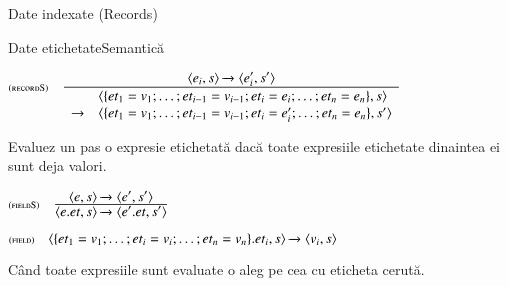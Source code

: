 \documentclass[xcolor=pdftex,romanian,colorlinks]{beamer}
\begin{document}
\begin{section}{Date indexate (Records)}
\begin{frame}{Date etichetate}{Semantică}
\begin{itemize}
\vitem[] $\reg[recordS]{\begin{array}{ll}&\c{\{{\it et}_1 = v_1;\ldots;{\it et}_{i-1}=v_{i-1};{\it et}_i = e_i;\ldots;{\it et}_{n}=e_{n}\},s}\\\rightarrow&\c{\{{\it et}_1 = v_1;\ldots;{\it et}_{i-1}=v_{i-1};{\it et}_i = e_i';\ldots;{\it et}_{n}=e_{n}\},s'}\end{array}}{\Ss{\c{e_i,s}}{\c{e_i',s'}}}{}$

Evaluez un pas o expresie etichetată dacă toate expresiile etichetate dinaintea ei sunt deja valori.

\vitem[] $\reg[fieldS]{\Ss{\c{e.{\it et},s}}{\c{e'.{\it et},s'}}}{\Ss{\c{e,s}}{\c{e',s'}}}{}$

\vitem[] $\reg[field]{\Ss{\c{\{{\it et}_1 = v_1;\ldots;{\it et}_i = v_i;\ldots;{\it et}_{n}=v_{n}\}.{\it et}_i,s}}{\c{v_i,s}}}{}{}$ 

Când toate expresiile sunt evaluate o aleg pe cea cu eticheta cerută.

\end{itemize}
\end{frame}
\end{section}
\end{document}
